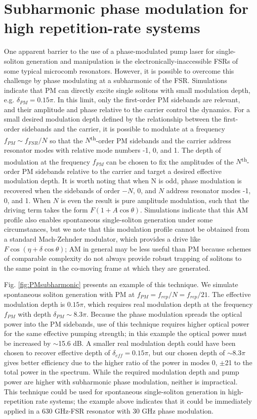 \section{Subharmonic phase modulation for high repetition-rate systems}

One apparent barrier to the use of a phase-modulated pump laser for single-soliton generation and manipulation is the electronically-inaccessible FSRs of some typical microcomb resonators. However, it is possible to overcome this challenge by phase modulating at a subharmonic of the FSR.  Simulations indicate that PM can directly excite single solitons with small modulation depth, e.g. $\delta_{PM}=0.15\pi$. In this limit, only the first-order PM sidebands are relevant, and their amplitude and phase relative to the carrier control the dynamics. For a small desired modulation depth defined by the relationship between the first-order sidebands and the carrier, it is possible to modulate at a frequency $f_{PM}\sim f_{FSR}/N$ so that the $N$\textsuperscript{th}-order PM sidebands and the carrier address resonator modes with relative mode numbers -1, 0, and 1. The depth of modulation at the frequency $f_{PM}$ can be chosen to fix the amplitudes of the $N$\textsuperscript{th}-order PM sidebands relative to the carrier and target a desired effective modulation depth. It is worth noting that when N is odd, phase modulation is recovered when the sidebands of order $-N$, 0, and $N$ address resonator modes -1, 0, and 1. When $N$ is even the result is pure amplitude modulation, such that the driving term takes the form $F(1+A \cos{\theta})$. Simulations indicate that this AM profile also enables spontaneous single-soliton generation under some circumstances, but we note that this modulation profile cannot be obtained from a standard Mach-Zehnder modulator, which provides a drive like $F \cos(\eta+\delta \cos{\theta})$; AM in general may be less useful than PM because schemes of comparable complexity do not always provide robust trapping of solitons to the same point in the co-moving frame at which they are generated.

Fig. \ref{fig:PMsubharmonic} presents an example of this technique. We simulate spontaneous soliton generation with PM at $f_{PM}=f_{rep}/N=f_{rep}/21$. The effective modulation depth is $0.15\pi$, which requires real modulation depth at the frequency $f_{PM}$ with depth $\delta_{PM}\sim8.3\pi$.  Because the phase modulation spreads the optical power into the PM sidebands, use of this technique requires higher optical power for the same effective pumping strength; in this example the optical power must be increased by $\sim$15.6 dB. A smaller real modulation depth could have been chosen to recover effective depth of $\delta_{eff}=0.15\pi$, but our chosen depth of $\sim8.3\pi$ gives better efficiency due to the higher ratio of the power in modes $0$, $\pm$21 to the total power in the spectrum. While the required modulation depth and pump power are higher with subharmonic phase modulation, neither is impractical. This technique could be used for spontaneous single-soliton generation in high-repetition rate systems; the example above indicates that it could be immediately applied in a 630 GHz-FSR resonator with 30 GHz phase modulation. 



